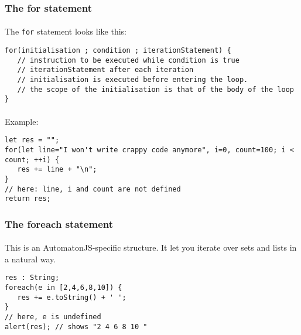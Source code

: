 \documentclass{article}
\begin{document}
\begin{sloppypar}
      
      
      

\subsubsection{ The for statement}


\paragraph{}
The \lstinline!for! statement looks like this:
{\begin{lstlisting}
for(initialisation ; condition ; iterationStatement) {
   // instruction to be executed while condition is true
   // iterationStatement after each iteration
   // initialisation is executed before entering the loop.
   // the scope of the initialisation is that of the body of the loop
}
\end{lstlisting}
}

         
         
\paragraph{}
Example:
{\begin{lstlisting}
let res = "";
for(let line="I won't write crappy code anymore", i=0, count=100; i < count; ++i) {
   res += line + "\n";
}
// here: line, i and count are not defined
return res;
\end{lstlisting}
}

      
      
      

\subsubsection{ The foreach statement}


\paragraph{}
This is an AutomatonJS-specific structure. It let you iterate over sets and lists in a natural way.

{\begin{lstlisting}
res : String;
foreach(e in [2,4,6,8,10]) {
   res += e.toString() + ' ';
}
// here, e is undefined
alert(res); // shows "2 4 6 8 10 "
\end{lstlisting}
}


\end{sloppypar}
\end{document}
